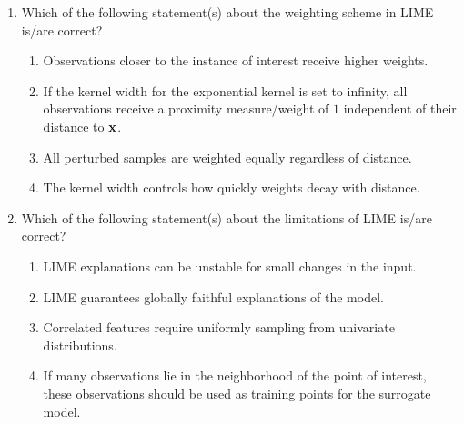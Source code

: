 {\begin{enumerate}
	\item Which of the following statement(s) about the weighting scheme in LIME is/are correct?
	\begin{enumerate}
		\item
		Observations closer to the instance of interest receive higher weights.
		\item
		If the kernel width for the exponential kernel is set to infinity, all observations receive a proximity measure/weight of $1$ independent of their distance to $\mathbf{x}$.
		\item
		All perturbed samples are weighted equally regardless of distance.
		\item
		The kernel width controls how quickly weights decay with distance.
	\end{enumerate}

	
	\item Which of the following statement(s) about the limitations of LIME is/are correct?
	\begin{enumerate}
		\item
		LIME explanations can be unstable for small changes in the input.
		\item
		LIME guarantees globally faithful explanations of the model.
		\item
		Correlated features require uniformly sampling from univariate distributions.
		\item 
		If many observations lie in the neighborhood of the point of interest, these observations should be used as training points for the surrogate model. 
	\end{enumerate}
\end{enumerate}
}

%	
%	
